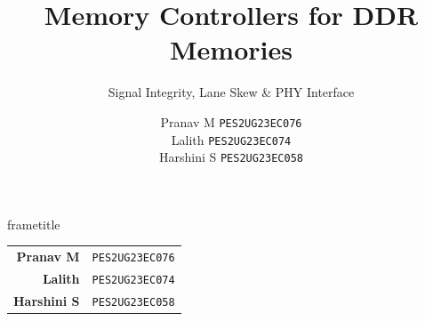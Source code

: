 \documentclass[aspectratio=169,10pt]{beamer}
\title{Memory Controllers for DDR Memories}
\subtitle{Signal Integrity, Lane Skew \& PHY Interface}
\author{%
  Pranav M \texttt{PES2UG23EC076}\\[4pt]
  Lalith \texttt{PES2UG23EC074}\\[4pt]
  Harshini S \texttt{PES2UG23EC058}%
}
\institute{Centre for Heterogeneous \& Intelligent Processing Systems\\PES University}
\date{}
\begin{document}

\begin{frame}
  \begin{beamercolorbox}[wd=\paperwidth,ht=0.22\paperheight,dp=0pt,
      center,sep=10pt]{frametitle}
    \color{white}\inserttitle
  \end{beamercolorbox}
  \vspace{28pt}
  \begin{center}
    \begin{tabular}{rl}
      \textbf{Pranav M}   & \texttt{PES2UG23EC076}\\[8pt]
      \textbf{Lalith}     & \texttt{PES2UG23EC074}\\[8pt]
      \textbf{Harshini S} & \texttt{PES2UG23EC058}\\
    \end{tabular}
  \end{center}
\end{frame}
\end{document}
